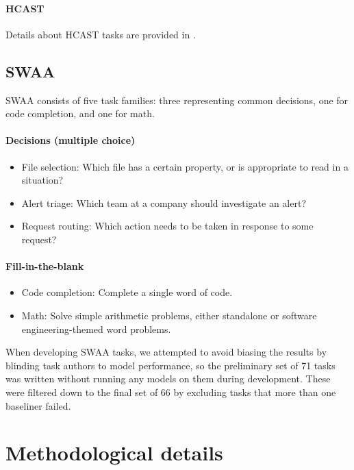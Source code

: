 \documentclass{article}
\newcommand{\gabenchmark}{HCAST}
\newcommand{\numswaatasks}{66}
\begin{document}
\paragraph{\gabenchmark{}} \label{appendix:ga}

Details about \gabenchmark{} tasks are provided in \citet{METR_HCAST}.

\subsection{SWAA} \label{sec:appendix-swaa}

SWAA consists of five task families: three representing common decisions, one for code completion, and one for math.

\paragraph{Decisions (multiple choice)}
\begin{itemize}
    \item File selection: Which file has a certain property, or is appropriate to read in a situation?
    \item Alert triage: Which team at a company should investigate an alert?
    \item Request routing: Which action needs to be taken in response to some request?
\end{itemize}

\paragraph{Fill-in-the-blank}
\begin{itemize}
\item Code completion: Complete a single word of code.
\item Math: Solve simple arithmetic problems, either standalone or software engineering-themed word problems.
\end{itemize}

When developing SWAA tasks, we attempted to avoid biasing the results by blinding task authors to model performance, so the preliminary set of 71 tasks was written without running any models on them during development. These were filtered down to the final set of \numswaatasks{} by excluding tasks that more than one baseliner failed.

\section{Methodological details}
\end{document}
